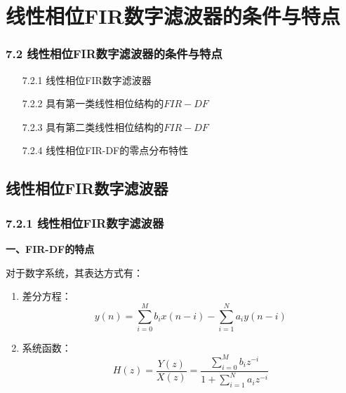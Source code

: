 \documentclass[notheorems,compress,mathserif,table]{beamer}
\begin{document}
\section{线性相位FIR数字滤波器的条件与特点}


\begin{frame}\frametitle{7.2 线性相位FIR数字滤波器的条件与特点}%

\begin{enumerate}
  \item [7.2.1 ] 线性相位FIR数字滤波器
  \item [7.2.2 ] 具有第一类线性相位结构的$FIR-DF$
  \item [7.2.3 ] 具有第二类线性相位结构的$FIR-DF$
  \item [7.2.4 ] 线性相位FIR-DF的零点分布特性
\end{enumerate}
\end{frame}


\subsection{线性相位FIR数字滤波器}


\begin{frame}[shrink]\frametitle{7.2.1 线性相位FIR数字滤波器}%
\textbf{一、FIR-DF的特点}

    对于数字系统，其表达方式有：
    \begin{enumerate}
      \item \quad 差分方程：
          $$y(n)=\sum_{i=0}^{M}b_ix(n-i) - \sum_{i=1}^{N}a_iy(n-i)$$

      \item \quad 系统函数：
          $$H(z)=\frac{Y(z)}{X(z)}= \frac{\sum_{i=0}^{M}b_iz^{-i}}{1+\sum_{i=1}^{N}a_i z^{-i}}$$
    \end{enumerate}
\end{frame}
\end{document}
